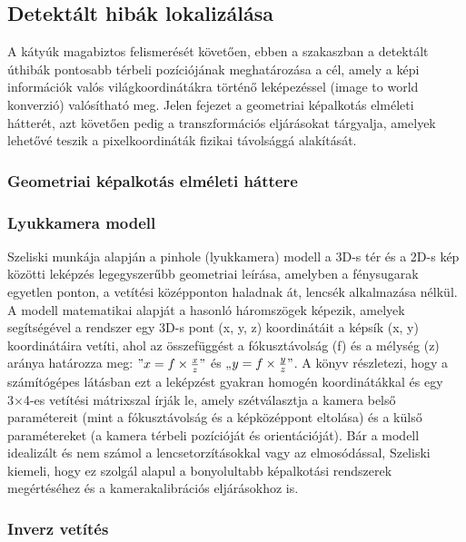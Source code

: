 \subsection{Detektált hibák lokalizálása}

A kátyúk magabiztos felismerését követően, ebben a szakaszban a
detektált úthibák pontosabb térbeli pozíciójának meghatározása a cél,
amely a képi információk valós világkoordinátákra történő leképezéssel
(image to world konverzió) valósítható meg. Jelen fejezet a geometriai
képalkotás elméleti hátterét, azt követően pedig a transzformációs
eljárásokat tárgyalja, amelyek lehetővé teszik a pixelkoordináták
fizikai távolsággá alakítását.

\subsubsection{Geometriai képalkotás elméleti háttere}

\subsubsection*{Lyukkamera modell}

Szeliski \cite{szeliskiComputerVisionAlgorithms2011} munkája alapján a pinhole (lyukkamera) modell a 3D-s
tér és a 2D-s kép közötti leképzés legegyszerűbb geometriai leírása,
amelyben a fénysugarak egyetlen ponton, a vetítési középponton haladnak
át, lencsék alkalmazása nélkül. A modell matematikai alapját a hasonló
háromszögek képezik, amelyek segítségével a rendszer egy 3D-s pont (x,
y, z) koordinátáit a képsík (x, y) koordinátáira vetíti, ahol az
összefüggést a fókusztávolság (f) és a mélység (z) aránya határozza meg:
\("x = f \times \frac{x}{z}"\) és „\(y = f \times \frac{y}{z}"\). A
könyv részletezi, hogy a számítógépes látásban ezt a leképzést gyakran
homogén koordinátákkal és egy 3×4-es vetítési mátrixszal írják le, amely
szétválasztja a kamera belső paramétereit (mint a fókusztávolság és a
képközéppont eltolása) és a külső paramétereket (a kamera térbeli
pozícióját és orientációját). Bár a modell idealizált és nem számol a
lencsetorzításokkal vagy az elmosódással, Szeliski kiemeli, hogy ez
szolgál alapul a bonyolultabb képalkotási rendszerek megértéséhez és a
kamerakalibrációs eljárásokhoz is.

\subsubsection*{Inverz vetítés}

